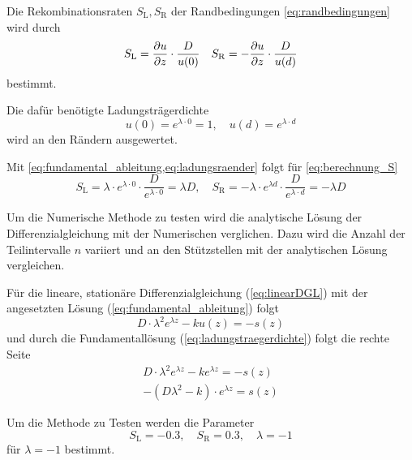 Die Rekombinationsraten $S_\mathrm{L},S_\mathrm{R}$ der Randbedingungen
\cref{eq:randbedingungen} wird durch
\begin{equation}\label{eq:berechnung_S}
	S_\mathrm{L}=\pdv{u}{z}\cdot\frac{D}{u(0)} \quad
	S_\mathrm{R}=-\pdv{u}{z}\cdot \frac{D}{u(d)}
\end{equation}
bestimmt.

Die dafür benötigte Ladungsträgerdichte
\begin{equation}\label{eq:ladungsraender}
	u(0)=e^{\lambda \cdot 0}=1 , \quad u(d)=e^{\lambda \cdot d}
\end{equation}
 wird an den Rändern ausgewertet.
 
Mit \cref{eq:fundamental_ableitung,eq:ladungsraender} folgt für \cref{eq:berechnung_S}
\begin{equation}
	S_\mathrm{L}=\lambda \cdot e^{\lambda \cdot 0}\cdot \frac{D}{e^{\lambda \cdot 0}}=\lambda D,\quad	S_\mathrm{R}=-\lambda \cdot e^{\lambda d}\cdot\frac{D}{e^{\lambda \cdot d}}=-\lambda D
\end{equation} 



Um die Numerische Methode zu testen wird die analytische Lösung der Differenzialgleichung mit der Numerischen verglichen.
Dazu wird die Anzahl der Teilintervalle $n$ variiert und an den Stützstellen mit der analytischen Lösung vergleichen.

Für die lineare, stationäre Differenzialgleichung (\cref{eq:linearDGL}) mit der angesetzten Lösung (\cref{eq:fundamental_ableitung}) folgt
\begin{equation}\label{eq:rechteseit}
	D\cdot\lambda^2 e^{\lambda z}-ku(z)=-s(z)
\end{equation}
und durch die Fundamentallösung (\cref{eq:ladungstraegerdichte}) folgt die rechte Seite
\begin{equation}
	\begin{split}
		D\cdot\lambda^2 e^{\lambda z}-ke^{\lambda z}=-s(z) \\
		-\left(D\lambda^2-k\right)\cdot e^{\lambda z}=s(z)
	\end{split}
\end{equation}

Um die Methode zu Testen werden die Parameter
\begin{equation}
	S_\mathrm{L}=-0.3,\quad S_\mathrm{R}=0.3,\quad \lambda=-1
\end{equation}
 für $\lambda=-1$ bestimmt.
 
